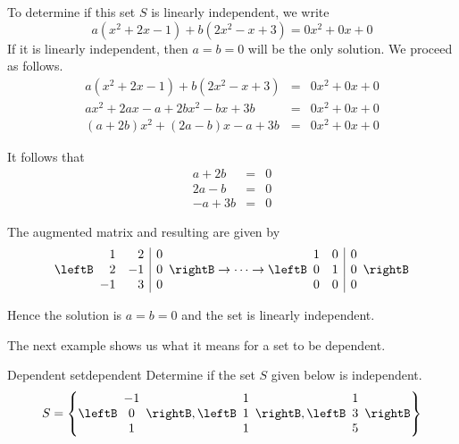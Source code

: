 \begin{solution}
To determine if this set $S$ is linearly independent, we write
\[
a ( x^2 + 2x -1 ) + b(2x^2 - x + 3) = 0x^2 + 0x + 0
\]
If it is linearly independent, then $a=b=0$ will be the only solution. We proceed as follows. 
\begin{eqnarray*}
a ( x^2 + 2x -1 ) + b(2x^2 - x + 3) &=& 0x^2 + 0x + 0 \\
ax^2 + 2ax - a + 2bx^2 - bx + 3b &=& 0x^2 + 0x + 0 \\
(a+2b)x^2 + (2a -b)x  - a + 3b &=&  0x^2 + 0x + 0
\end{eqnarray*}

It follows that
\begin{eqnarray*}
a + 2b &=& 0 \\
2a - b &=& 0 \\
-a + 3b &=& 0
\end{eqnarray*}

The augmented matrix and resulting {\rref} are given by
\[
\leftB \begin{array}{rr|r}
1 & 2 & 0 \\
2 & -1 & 0 \\
-1 & 3 & 0 
\end{array} \rightB 
\rightarrow \cdots \rightarrow
\leftB \begin{array}{rr|r}
1 & 0 & 0 \\
0 & 1 & 0 \\
0 & 0 & 0 
\end{array} \rightB 
\]

Hence the solution is $a=b=0$ and the set is linearly independent. 
\end{solution}

The next example shows us what it means for a set to be dependent.

\begin{example}{Dependent set}{dependent}
Determine if the set $S$ given below is independent. 
\[
S=\left\{
\leftB\begin{array}{c} -1 \\ 0 \\ 1 \end{array}\rightB,
\leftB\begin{array}{c} 1 \\ 1 \\ 1 \end{array}\rightB,
\leftB\begin{array}{c} 1 \\ 3 \\ 5 \end{array}\rightB \right\}
\]
\end{example}

